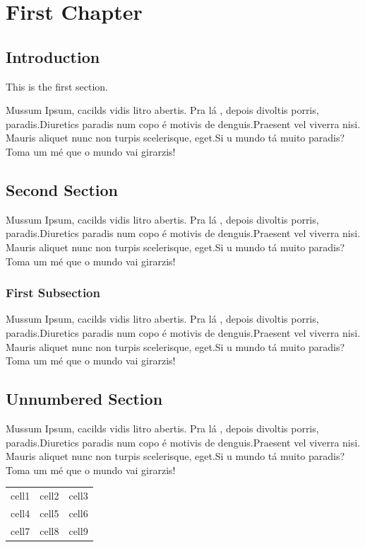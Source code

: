 \documentclass[12pt, letterpaper]{report}
\begin{document}
    \chapter{First Chapter}

    
        \section{Introduction}

            This is the first section.

            Mussum Ipsum, cacilds vidis litro abertis. Pra lá , depois divoltis porris, paradis.Diuretics paradis num copo é motivis de denguis.Praesent vel viverra nisi. Mauris aliquet nunc non turpis scelerisque, eget.Si u mundo tá muito paradis? Toma um mé que o mundo vai girarzis!

        \section{Second Section}

            Mussum Ipsum, cacilds vidis litro abertis. Pra lá , depois divoltis porris, paradis.Diuretics paradis num copo é motivis de denguis.Praesent vel viverra nisi. Mauris aliquet nunc non turpis scelerisque, eget.Si u mundo tá muito paradis? Toma um mé que o mundo vai girarzis!

            \subsection*{First Subsection}
                Mussum Ipsum, cacilds vidis litro abertis. Pra lá , depois divoltis porris, paradis.Diuretics paradis num copo é motivis de denguis.Praesent vel viverra nisi. Mauris aliquet nunc non turpis scelerisque, eget.Si u mundo tá muito paradis? Toma um mé que o mundo vai girarzis!

        \section*{Unnumbered Section}
            Mussum Ipsum, cacilds vidis litro abertis. Pra lá , depois divoltis porris, paradis.Diuretics paradis num copo é motivis de denguis.Praesent vel viverra nisi. Mauris aliquet nunc non turpis scelerisque, eget.Si u mundo tá muito paradis? Toma um mé que o mundo vai girarzis!

    \pagebreak


    \begin{center}
        \begin{tabular}{c c c}

            cell1 & cell2 & cell3 \\
            cell4 & cell5 & cell6 \\
            cell7 & cell8 & cell9
    
        \end{tabular}
    \end{center}
\end{document}
